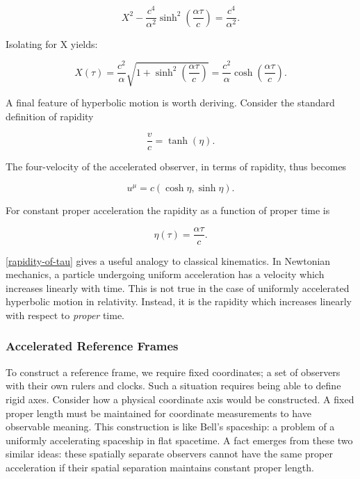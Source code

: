 \documentclass[11pt]{article}
\begin{document}
\begin{equation}
    \label{hyperbolic-X-of-tau}
    X^2 - \frac{c^4}{\alpha^2} \sinh^2\left( \frac{\alpha \tau}{c}\right) = \frac{c^4}{\alpha^2}.
\end{equation}

Isolating for X yields:

\begin{equation}
    \label{hyperbolic-X-of-tau-2}
    X(\tau) = \frac{c^2}{\alpha}\sqrt{1 + \sinh^2\left( \frac{\alpha \tau}{c}\right) } = \frac{c^2}{\alpha} \cosh\left( \frac{\alpha \tau}{c}\right).
\end{equation}

A final feature of hyperbolic motion is worth deriving. Consider the standard definition of rapidity

\begin{equation}
    \label{rapidity}
    \frac{v}{c} = \tanh (\eta).
\end{equation}

The four-velocity of the accelerated observer, in terms of rapidity, thus becomes

\begin{equation}
    \label{four-vel-of-rapidity}
    u^\mu = c(\cosh \eta, \sinh \eta).
\end{equation}

For constant proper acceleration the rapidity as a function of proper time is

\begin{equation}
    \label{rapidity-of-tau}
    \eta (\tau) = \frac{\alpha \tau}{c}.
\end{equation}

\eqref{rapidity-of-tau} gives a useful analogy to classical kinematics. In Newtonian mechanics, a particle undergoing uniform acceleration has a velocity which increases linearly with time. This is not true in the case of uniformly accelerated hyperbolic motion in relativity. Instead, it is the rapidity which increases linearly with respect to \textit{proper} time.

\subsubsection{Accelerated Reference Frames}

To construct a reference frame, we require fixed coordinates; a set of observers with their own rulers and clocks. Such a situation requires being able to define rigid axes. Consider how a physical coordinate axis would be constructed. A fixed proper length must be maintained for coordinate measurements to have observable meaning. This construction is like Bell's spaceship: a problem of a uniformly accelerating spaceship in flat spacetime. A fact emerges from these two similar ideas: these spatially separate observers cannot have the same proper acceleration if their spatial separation maintains constant proper length.
\end{document}
